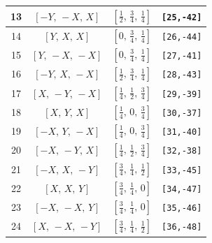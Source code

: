 \documentclass[fleqn,8pt]{jsarticle}
\begin{document}
\begin{longtable}{cccc}
13 & $\left[ - Y,\, - X,\, X \right]$ & $\left[ \frac{1}{2},\, \frac{3}{4},\, \frac{1}{4} \right]$ & {\tt [25,-42]} \\ \hline
14 & $\left[ Y,\, X,\, X \right]$ & $\left[ 0,\, \frac{3}{4},\, \frac{1}{4} \right]$ & {\tt [26,-44]} \\ \hline
15 & $\left[ Y,\, - X,\, - X \right]$ & $\left[ 0,\, \frac{3}{4},\, \frac{1}{4} \right]$ & {\tt [27,-41]} \\ \hline
16 & $\left[ - Y,\, X,\, - X \right]$ & $\left[ \frac{1}{2},\, \frac{3}{4},\, \frac{1}{4} \right]$ & {\tt [28,-43]} \\ \hline
17 & $\left[ X,\, - Y,\, - X \right]$ & $\left[ \frac{1}{4},\, \frac{1}{2},\, \frac{3}{4} \right]$ & {\tt [29,-39]} \\ \hline
18 & $\left[ X,\, Y,\, X \right]$ & $\left[ \frac{1}{4},\, 0,\, \frac{3}{4} \right]$ & {\tt [30,-37]} \\ \hline
19 & $\left[ - X,\, Y,\, - X \right]$ & $\left[ \frac{1}{4},\, 0,\, \frac{3}{4} \right]$ & {\tt [31,-40]} \\ \hline
20 & $\left[ - X,\, - Y,\, X \right]$ & $\left[ \frac{1}{4},\, \frac{1}{2},\, \frac{3}{4} \right]$ & {\tt [32,-38]} \\ \hline
21 & $\left[ - X,\, X,\, - Y \right]$ & $\left[ \frac{3}{4},\, \frac{1}{4},\, \frac{1}{2} \right]$ & {\tt [33,-45]} \\ \hline
22 & $\left[ X,\, X,\, Y \right]$ & $\left[ \frac{3}{4},\, \frac{1}{4},\, 0 \right]$ & {\tt [34,-47]} \\ \hline
23 & $\left[ - X,\, - X,\, Y \right]$ & $\left[ \frac{3}{4},\, \frac{1}{4},\, 0 \right]$ & {\tt [35,-46]} \\ \hline
24 & $\left[ X,\, - X,\, - Y \right]$ & $\left[ \frac{3}{4},\, \frac{1}{4},\, \frac{1}{2} \right]$ & {\tt [36,-48]} \\
\end{longtable}
\renewcommand{\arraystretch}{1.2}
\end{document}
